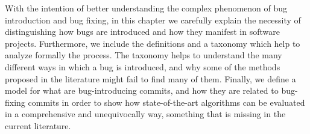 \documentclass[a4paper, 12pt]{book}
\begin{document}
With the intention of better understanding the complex phenomenon of bug introduction and bug fixing, in this chapter we carefully explain the necessity of distinguishing how bugs are introduced and how they manifest in software projects. Furthermore, we include the definitions and a taxonomy which help to analyze formally the process. The taxonomy helps to understand the many different ways in which a bug is introduced, and why some of the methods proposed in the literature might fail to find many of them. Finally, we define a model for what are bug-introducing commits, and how they are related to bug-fixing commits in order to show how state-of-the-art algorithms can be evaluated in a comprehensive and unequivocally way, something that is missing in the current literature.



%
\end{document}
